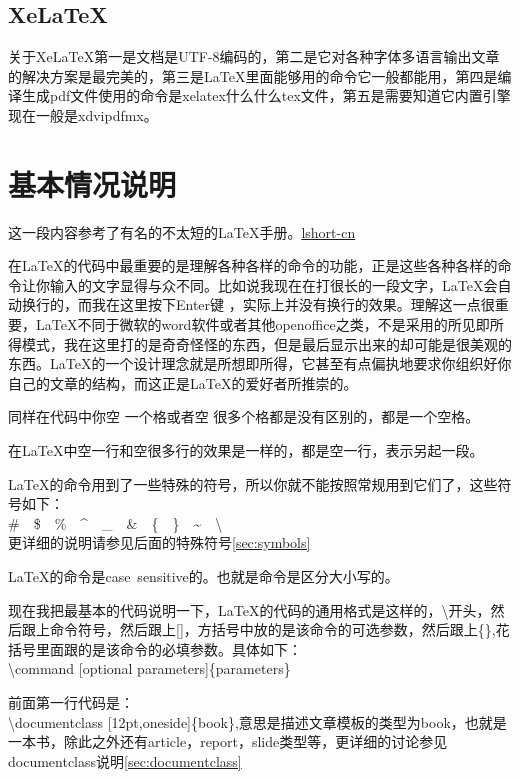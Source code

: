 \subsection{XeLaTeX}
关于XeLaTeX第一是文档是UTF-8编码的，第二是它对各种字体多语言输出文章的解决方案是最完美的，第三是LaTeX里面能够用的命令它一般都能用，第四是编译生成pdf文件使用的命令是xelatex什么什么tex文件，第五是需要知道它内置引擎现在一般是xdvipdfmx。


\section{基本情况说明}

这一段内容参考了有名的不太短的LaTeX手册。\href{http://www.ctan.org/pkg/lshort-zh-cn}{lshort-cn}

在\LaTeX 的代码中最重要的是理解各种各样的命令的功能，正是这些各种各样的命令让你输入的文字显得与众不同。比如说我现在在打很长的一段文字，\LaTeX 会自动换行的，而我在这里按下Enter键
，实际上并没有换行的效果。理解这一点很重要，\LaTeX 不同于微软的word软件或者其他openoffice之类，不是采用的所见即所得模式，我在这里打的是奇奇怪怪的东西，但是最后显示出来的却可能是很美观的东西。\LaTeX 的一个设计理念就是所想即所得，它甚至有点偏执地要求你组织好你自己的文章的结构，而这正是\LaTeX 的爱好者所推崇的。

同样在代码中你空 一个格或者空      很多个格都是没有区别的，都是一个空格。

在\LaTeX 中空一行和空很多行的效果是一样的，都是空一行，表示另起一段。

\LaTeX 的命令用到了一些特殊的符号，所以你就不能按照常规用到它们了，这些符号如下：\\
\#~~\$~~\%~~\^~~\_~~\&~~\{~~\}~~\~~~\textbackslash \\
更详细的说明请参见后面的特殊符号\ref{sec:symbols}

\LaTeX 的命令是case~sensitive的。也就是命令是区分大小写的。

现在我把最基本的代码说明一下，\LaTeX 的代码的通用格式是这样的，\textbackslash 开头，然后跟上命令符号，然后跟上[]，方括号中放的是该命令的可选参数，然后跟上\{\},花括号里面跟的是该命令的必填参数。具体如下：\\
\textbackslash command [optional parameters]\{parameters\}

前面第一行代码是：\\
\textbackslash documentclass [12pt,oneside]\{book\},意思是描述文章模板的类型为book，也就是一本书，除此之外还有article，report，slide类型等，更详细的讨论参见documentclass说明\ref{sec:documentclass}

